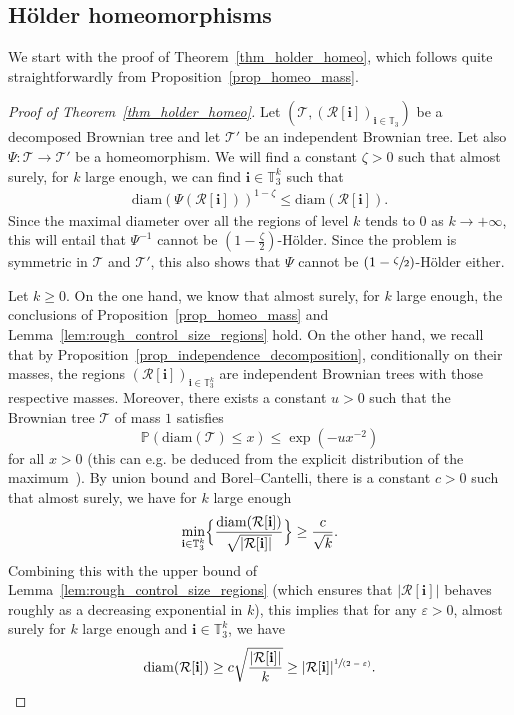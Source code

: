 \documentclass[11pt]{article}
\newcommand{\spfrac}[2]{\sfrac{#1}{(#2)}}
\newcommand{\Pp}[1]{\mathbb{P} \left(#1\right)}
\newcommand{\Tt}{\mathcal{T}}
\newcommand{\Rr}{\mathcal{R}}
\newcommand{\ii}{\mathbf{i}}
\newcommand{\diam}{\mathrm{diam}}
\let\eps\varepsilon
\theoremstyle{plain}
\theoremstyle{definition}
\numberwithin{equation}{section}
\begin{document}
\subsection{Hölder homeomorphisms}
We start with the proof of Theorem~\ref{thm_holder_homeo}, which follows quite straightforwardly from Proposition~\ref{prop_homeo_mass}.
\begin{proof}[Proof of Theorem~\ref{thm_holder_homeo}]
Let $\left( \Tt, \left( \Rr[\ii] \right)_{\ii \in \mathbb{T}_3} \right)$ be a decomposed Brownian tree and let $\Tt'$ be an independent Brownian tree. Let also $\Psi:\Tt\rightarrow\Tt'$ be a homeomorphism. We will find a constant $\zeta>0$ such that almost surely, for $k$ large enough, we can find $\ii \in \mathbb{T}_3^k$ such that
\begin{align}
\diam(\Psi(\Rr[\ii ]))^{1-\zeta}\leq \diam(\Rr[\ii ]).
\end{align}
Since the maximal diameter over all the regions of level $k$ tends to $0$ as $k \to +\infty$, this will entail that $\Psi^{-1}$ cannot be $(1-\frac{\zeta}{2})$-Hölder.
Since the problem is symmetric in $\Tt$ and $\Tt'$, this also shows that $\Psi$ cannot be $(1-\sfrac{\zeta}{2})$-Hölder either.

Let $k \geq 0$. On the one hand, we know that almost surely, for $k$ large enough, the conclusions of Proposition~\ref{prop_homeo_mass} and Lemma~\ref{lem:rough_control_size_regions} hold. On the other hand, we recall that by Proposition~\ref{prop_independence_decomposition}, conditionally on their masses, the regions $(\Rr[\ii ])_{\ii \in
\mathbb{T}_3^k}$ are independent Brownian trees with those respective masses.
Moreover, there exists a constant $u>0$ such that the Brownian tree $\Tt$ of mass $1$ satisfies
\[\Pp{\diam(\Tt)\leq x} \leq \exp(-ux^{-2})\]
for all $x>0$ (this can e.g. be deduced from the explicit distribution of the maximum~\cite{kennedy_distribution_1976}). By union bound and Borel--Cantelli, there is a constant $c>0$ such that almost surely, we have for $k$ large enough
\begin{align*}
\min_{\ii \in \mathbb{T}_3^k} \Bigl\lbrace\frac{\diam (\Rr[\ii ])}{\sqrt{|\Rr[\ii ]|}} \Bigr\rbrace \geq \frac{c}{\sqrt{k}}.
\end{align*}
Combining this with the upper bound of Lemma~\ref{lem:rough_control_size_regions} (which ensures that $|\Rr[\ii]|$ behaves roughly as a decreasing exponential in $k$),
this implies that for any $\eps>0$, almost surely for $k$ large enough and $\ii \in \mathbb{T}_3^k$, we have
\begin{equation}\label{eq:diam is at least mass to the half minus epsilon}
\diam (\Rr[\ii ]) \geq c \sqrt{\frac{|\Rr[\ii ]|}{k}} \geq |\Rr[\ii ]|^{\spfrac{1}{2-\eps}}.
\end{equation}


\end{proof}
\end{document}

